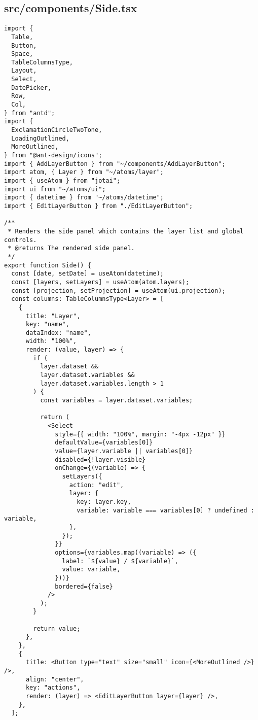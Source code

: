 \subsection{src/components/Side.tsx}
\begin{verbatim}
import {
  Table,
  Button,
  Space,
  TableColumnsType,
  Layout,
  Select,
  DatePicker,
  Row,
  Col,
} from "antd";
import {
  ExclamationCircleTwoTone,
  LoadingOutlined,
  MoreOutlined,
} from "@ant-design/icons";
import { AddLayerButton } from "~/components/AddLayerButton";
import atom, { Layer } from "~/atoms/layer";
import { useAtom } from "jotai";
import ui from "~/atoms/ui";
import { datetime } from "~/atoms/datetime";
import { EditLayerButton } from "./EditLayerButton";

/**
 * Renders the side panel which contains the layer list and global controls.
 * @returns The rendered side panel.
 */
export function Side() {
  const [date, setDate] = useAtom(datetime);
  const [layers, setLayers] = useAtom(atom.layers);
  const [projection, setProjection] = useAtom(ui.projection);
  const columns: TableColumnsType<Layer> = [
    {
      title: "Layer",
      key: "name",
      dataIndex: "name",
      width: "100%",
      render: (value, layer) => {
        if (
          layer.dataset &&
          layer.dataset.variables &&
          layer.dataset.variables.length > 1
        ) {
          const variables = layer.dataset.variables;

          return (
            <Select
              style={{ width: "100%", margin: "-4px -12px" }}
              defaultValue={variables[0]}
              value={layer.variable || variables[0]}
              disabled={!layer.visible}
              onChange={(variable) => {
                setLayers({
                  action: "edit",
                  layer: {
                    key: layer.key,
                    variable: variable === variables[0] ? undefined : variable,
                  },
                });
              }}
              options={variables.map((variable) => ({
                label: `${value} / ${variable}`,
                value: variable,
              }))}
              bordered={false}
            />
          );
        }

        return value;
      },
    },
    {
      title: <Button type="text" size="small" icon={<MoreOutlined />} />,
      align: "center",
      key: "actions",
      render: (layer) => <EditLayerButton layer={layer} />,
    },
  ];


\end{verbatim}
